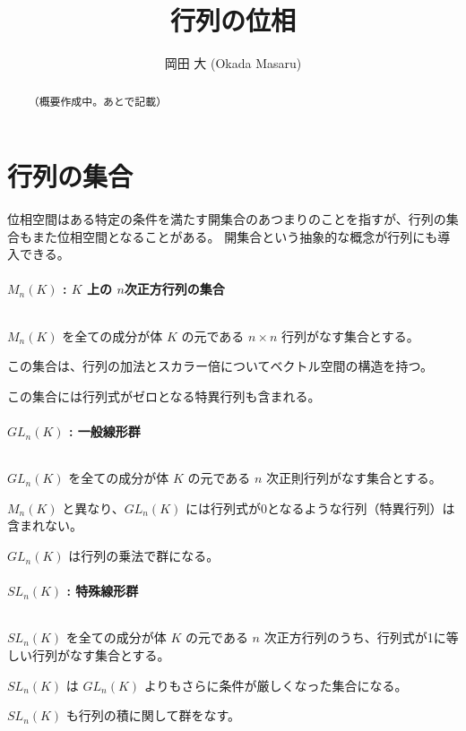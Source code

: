 \documentclass[uplatex,a4j,12pt,dvipdfmx]{jsarticle}
\title{
行列の位相
}
\author{
岡田 大 (Okada Masaru)
}
\begin{document}
\maketitle


\begin{abstract}
	（概要作成中。あとで記載）
\end{abstract}

\section{行列の集合}

位相空間はある特定の条件を満たす開集合のあつまりのことを指すが、行列の集合もまた位相空間となることがある。
開集合という抽象的な概念が行列にも導入できる。

\paragraph{$M_{n}(K)$ : $K$ 上の $n$次正方行列の集合}

${}$

$M_{n}(K)$ を全ての成分が体 $K$ の元である $n \times n$ 行列がなす集合とする。

この集合は、行列の加法とスカラー倍についてベクトル空間の構造を持つ。

この集合には行列式がゼロとなる特異行列も含まれる。

\paragraph{$GL_{n}(K)$ : 一般線形群}

${}$

$GL_{n}(K)$ を全ての成分が体 $K$ の元である $n$ 次正則行列がなす集合とする。

$M_{n}(K)$ と異なり、$GL_{n}(K)$ には行列式が0となるような行列（特異行列）は含まれない。

$GL_{n}(K)$ は行列の乗法で群になる。

\paragraph{$SL_{n}(K)$ : 特殊線形群}

${}$

$SL_{n}(K)$ を全ての成分が体 $K$ の元である $n$ 次正方行列のうち、行列式が1に等しい行列がなす集合とする。

$SL_{n}(K)$ は $GL_{n}(K)$ よりもさらに条件が厳しくなった集合になる。

$SL_{n}(K)$ も行列の積に関して群をなす。
\end{document}
